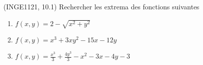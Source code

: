 
\begin{exercice}\label{exoFoncDeuxVar0029}

	(INGE1121, 10.1) Rechercher les extrema des fonctions suivantes
	\begin{enumerate}

		\item
			$f(x,y)=2-\sqrt{x^2+y^2}$
		\item
			$f(x,y)=x^3+3xy^2-15x-12y$
		\item
			$f(x,y)=\frac{ x^3 }{ 3 }+\frac{ 4y^3 }{ 3 }-x^2-3x-4y-3$

	\end{enumerate}

\end{exercice}
